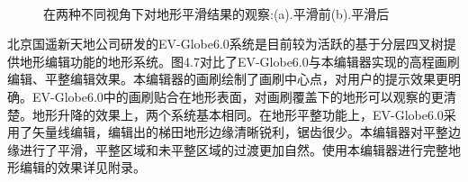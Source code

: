 \begin{figure}[htbp]
\centering
{}
\\

\caption{在两种不同视角下对地形平滑结果的观察:(a).平滑前(b).平滑后}
\end{figure}

北京国遥新天地公司研发的EV-Globe6.0系统\supercite{ev-globe}是目前较为活跃的基于分层四叉树提供地形编辑功能的地形系统。图4.7对比了EV-Globe6.0与本编辑器实现的高程画刷编辑、平整编辑效果。本编辑器的画刷绘制了画刷中心点，对用户的提示效果更明确。EV-Globe6.0中的画刷贴合在地形表面，对画刷覆盖下的地形可以观察的更清楚。地形升降的效果上，两个系统基本相同。在地形平整功能上，EV-Globe6.0采用了矢量线编辑，编辑出的梯田地形边缘清晰锐利，锯齿很少。本编辑器对平整边缘进行了平滑，平整区域和未平整区域的过渡更加自然。使用本编辑器进行完整地形编辑的效果详见附录。\par

